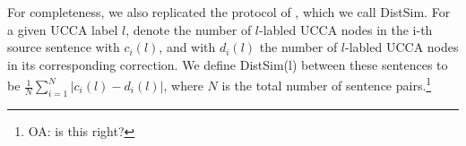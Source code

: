 \documentclass[letter,11pt]{article}
\newcommand{\oa}[1]{\footnote{\color{red}OA: #1}}
\begin{document}
For completeness, we also replicated the protocol of ,
which we call {\sc DistSim}. For a given UCCA label $l$, denote the
number of $l$-labled UCCA nodes 
in the i-th source sentence with $c_i(l)$, and with $d_i(l)$ the number of $l$-labled UCCA nodes
in its corresponding correction. We define {\sc DistSim}(l) between these
sentences to be $\frac{1}{N}\sum_{i=1}^N \vert c_i(l) - d_i(l) \vert$, where
$N$ is the total number of sentence pairs.\oa{is this right?}



\end{document}

